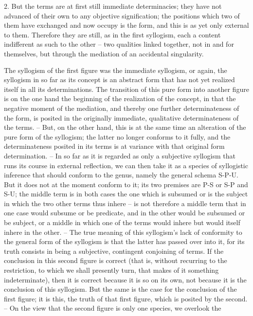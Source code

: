2. But the terms are at first still immediate determinacies; they have not
advanced of their own to any objective signification; the positions which
two of them have exchanged and now occupy is the form, and this is as yet
only external to them. Therefore they are still, as in the first syllogism, each
a content indifferent as such to the other – two qualities linked together,
not in and for themselves, but through the mediation of an accidental
singularity.

The syllogism of the first figure was the immediate syllogism, or again,
the syllogism in so far as its concept is an abstract form that has not yet
realized itself in all its determinations. The transition of this pure form into
another figure is on the one hand the beginning of the realization of the
concept, in that the negative moment of the mediation, and thereby one
further determinateness of the form, is posited in the originally immediate,
qualitative determinateness of the terms. – But, on the other hand, this
is at the same time an alteration of the pure form of the syllogism; the
latter no longer conforms to it fully, and the determinateness posited in its
terms is at variance with that original form determination. – In so far as
it is regarded as only a subjective syllogism that runs its course in external
reflection, we can then take it as a species of syllogistic inference that should
conform to the genus, namely the general schema S-P-U. But it does not
at the moment conform to it; its two premises are P-S or S-P and S-U; the
middle term is in both cases the one which is subsumed or is the subject
in which the two other terms thus inhere – is not therefore a middle
term that in one case would subsume or be predicate, and in the other
would be subsumed or be subject, or a middle in which one of the terms
would inhere but would itself inhere in the other. – The true meaning
of this syllogism’s lack of conformity to the general form of the syllogism
is that the latter has passed over into it, for its truth consists in being a
subjective, contingent conjoining of terms. If the conclusion in this second
figure is correct (that is, without recurring to the restriction, to which we
shall presently turn, that makes of it something indeterminate), then it is
correct because it is so on its own, not because it is the conclusion of this
syllogism. But the same is the case for the conclusion of the first figure;
it is this, the truth of that first figure, which is posited by the second. –
On the view that the second figure is only one species, we overlook the
